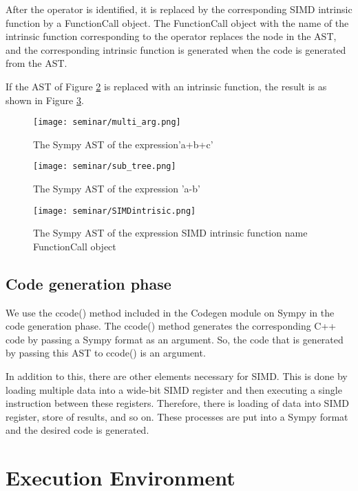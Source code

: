 \documentclass[ams]{article}
\begin{document}
After the operator is identified, it is replaced by the corresponding SIMD intrinsic function by a FunctionCall object.
The FunctionCall object with the name of the intrinsic function corresponding to the operator replaces the node in the AST, and the corresponding intrinsic function is generated when the code is generated from the AST.

If the AST of Figure \ref{fig:f2} is replaced with an intrinsic function, the result is as shown in Figure \ref{fig:f3}.


\begin{figure}[htbp]
\centering
\texttt{[image: seminar/multi\_arg.png]}
\caption{The Sympy AST of the expression'a+b+c'}
\label{fig:f1}
\end{figure}

\begin{figure}[htbp]
\centering
\texttt{[image: seminar/sub\_tree.png]}
\caption{The Sympy AST of the expression 'a-b'}
\label{fig:f2}
\end{figure}

\begin{figure}[htbp]
\centering
\texttt{[image: seminar/SIMDintrisic.png]}
\caption{The Sympy AST of the expression SIMD intrinsic function name FunctionCall object}
\label{fig:f3}
\end{figure}


\subsection{Code generation phase}
We use the ccode() method included in the Codegen module on Sympy in the code generation phase. The ccode() method generates the corresponding C++ code by passing a Sympy format as an argument.  So, the code that is generated by passing this AST to ccode() is an argument.


In addition to this, there are other elements necessary for SIMD. This is done by loading multiple data into a wide-bit SIMD register and then executing a single instruction between these registers. Therefore, there is loading of data into SIMD register, store of results, and so on. These processes are put into a Sympy format and the desired code is generated.



\section{Execution Environment}
\end{document}
